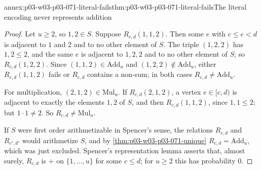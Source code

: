 \begin{annexitem}{annex:p03-w03-p03-071-literal-fails}{thm:p03-w03-p03-071-literal-fails}{The literal encoding never represents addition}
\begin{proof}
Let \(u\geq2\), so \(1,2\in S\).  Suppose \(R_{c,d}(1,1,2)\).  Then some
\(e\) with \(c\leq e<d\) is adjacent to \(1\) and \(2\) and to no other
element of \(S\).  The triple \((1,2,2)\) has \(1,2\leq2\), and the same
\(e\) is adjacent to \(1,2,2\) and to no other element of \(S\); so
\(R_{c,d}(1,2,2)\).  Since \((1,1,2)\in\mathrm{Add}_u\) and
\((1,2,2)\notin\mathrm{Add}_u\), either \(R_{c,d}(1,1,2)\) fails or
\(R_{c,d}\) contains a non-sum; in both cases \(R_{c,d}\neq\mathrm{Add}_u\).

For multiplication, \((2,1,2)\in\mathrm{Mul}_u\).  If \(R_{c,d}(2,1,2)\), a
vertex \(e\in[c,d)\) is adjacent to exactly the elements \(1,2\) of \(S\),
and then \(R_{c,d}(1,1,2)\), since \(1,1\leq2\); but \(1\cdot1\neq2\).  So
\(R_{c,d}\neq\mathrm{Mul}_u\).

If \(S\) were first order arithmetizable in Spencer's sense, the relations
\(R_{c,d}\) and \(R_{c',d'}\) would arithmetize \(S\), and by
\cref{thm:p03-w03-p03-071-unique} \(R_{c,d}=\mathrm{Add}_u\), which was just
excluded.  Spencer's representation lemma asserts that, almost surely,
\(R_{c,d}\) is \(+\) on \(\{1,\ldots,u\}\) for some \(c\leq d\); for
\(u\geq2\) this has probability \(0\).
\end{proof}
\end{annexitem}

